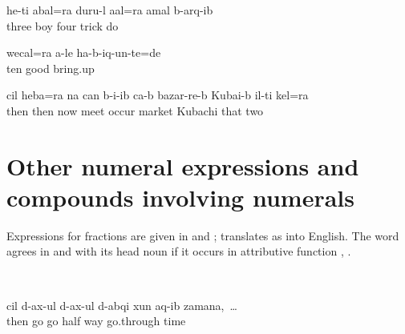 \ex\label{ex:mythreechildrenallplayedtricks}
\gll	he{\uvfr}-t{\lmk}i	{\eppl}a{\pha}bal=ra	dur{\phfr}u{\pha}-l	a{\vuvfr}{\lab}al=ra	{\eppl}a{\pha}mal	b-arq{\ej}-ib\\
		three	boy	four	trick	do\\
\glt	{}

\ex\label{ex:allchildrenwerebroughtupwell}
\gll	wec{\ej}al=ra	{\eppl}a{\pha}{\phfr}-le	ha-b-iq{\ej}-un-te=de\\
	ten	good	bring.up\\
\glt	{}

\ex\label{ex:thenthesetwoalsometonthemarket}
\gll	c{\ej}il	heba=ra	na	can	b-i{\paaf}-ib ca-b	bazar-re-b	Kuba{\paaf}i-b	il-t{\lmk}i	k{\ej}{\lab}el=ra\\
	then	then	now	meet	occur 	market	Kubachi	that	two\\
\glt	{}
\z




\section{Other numeral expressions and compounds involving numerals}
\label{sec:othernumeralexpressions}

Expressions for fractions are given in  and ;  translates as  into English. The word   agrees in  and  with its head noun if it occurs in attributive function , .
%

	\ea	\label{ex:fractions}
		\TabPositions{12em}
			 \tab {}  \\
			 \tab {}	


\ex\label{ex:thentheywentandwent}
\gll	c{\ej}il d-ax-ul d-ax-ul	d-abq{\ej}i x{\lmk}un aq-ib	zamana,~\ldots\\
	then go go	half way go.through	time\\
\glt	{}

